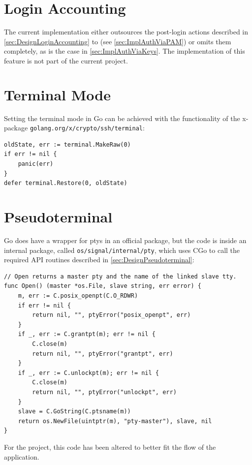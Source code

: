 \documentclass[10pt,a4paper,titlepage,twoside,english,final]{zhawreprt}
\begin{document}
\section{Login Accounting}\label{sec:ImplLoginAccounting}
The current implementation either outsources the post-login actions described in \ref{sec:DesignLoginAccounting} to \cite{login}(see \ref{sec:ImplAuthViaPAM}) or omits them completely, as is the case in \ref{sec:ImplAuthViaKeys}.
The implementation of this feature is not part of the current project.

\section{Terminal Mode}\label{sec:ImplTerminalMode}
Setting the \gls{terminal} mode in \gls{Go} can be achieved with the functionality of the x-package \linebreak\texttt{golang.org/x/crypto/ssh/terminal}:
\setlistingGo
\begin{lstlisting}[caption={Setting the \gls{terminal} mode in \gls{Go}},label=lst:GoTermMode]
oldState, err := terminal.MakeRaw(0)
if err != nil {
	panic(err)
}
defer terminal.Restore(0, oldState)
\end{lstlisting}

\section{Pseudoterminal}\label{sec:ImplPseudoterminal}
\gls{Go} does have a wrapper for \glspl{pty} in an official package, but the code is inside an internal package, called \texttt{os/signal/internal/pty}, which uses \gls{CGo} to call the required \gls{API} routines described in \ref{sec:DesignPseudoterminal}:
\setlistingGo
\begin{lstlisting}[caption={\gls{Go}'s \gls{pty} wrapper},label=lst:GoPty]
// Open returns a master pty and the name of the linked slave tty.
func Open() (master *os.File, slave string, err error) {
	m, err := C.posix_openpt(C.O_RDWR)
	if err != nil {
		return nil, "", ptyError("posix_openpt", err)
	}
	if _, err := C.grantpt(m); err != nil {
		C.close(m)
		return nil, "", ptyError("grantpt", err)
	}
	if _, err := C.unlockpt(m); err != nil {
		C.close(m)
		return nil, "", ptyError("unlockpt", err)
	}
	slave = C.GoString(C.ptsname(m))
	return os.NewFile(uintptr(m), "pty-master"), slave, nil
}
\end{lstlisting}
For the project, this code has been altered to better fit the flow of the application.
\end{document}
